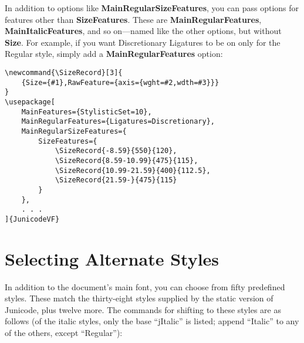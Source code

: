 \documentclass[12pt]{article}
\newcommand{\SizeRecord}[3]{{Size={#1},RawFeature={axis={wght=#2,wdth=#3}}}}
\begin{document}
\noindent In addition to options like \textbf{MainRegularSizeFeatures},
you can pass options for features other than \textbf{SizeFeatures}.
These are \textbf{MainRegularFeatures}, \textbf{MainItalicFeatures},
and so on---named like the other options, but without \textbf{Size}.
For example, if you want Discretionary Ligatures to be on only for the
Regular style, simply add a \textbf{MainRegularFeatures} option:

\footnotesize
\begin{verbatim}
\newcommand{\SizeRecord}[3]{
    {Size={#1},RawFeature={axis={wght=#2,wdth=#3}}}
}
\usepackage[
    MainFeatures={StylisticSet=10},
    MainRegularFeatures={Ligatures=Discretionary},
    MainRegularSizeFeatures={
        SizeFeatures={
            \SizeRecord{-8.59}{550}{120},
            \SizeRecord{8.59-10.99}{475}{115},
            \SizeRecord{10.99-21.59}{400}{112.5},
            \SizeRecord{21.59-}{475}{115}
        }
    },
    . . .
]{JunicodeVF}
\end{verbatim}
\normalsize

\section{Selecting Alternate Styles}

In addition to the document's main font, you can choose from fifty
predefined styles. These match the thirty-eight styles supplied by the
static version of Junicode, plus twelve more. The commands for shifting to these
styles are as follows (of the italic styles, only the base “jItalic” is listed;
append “Italic” to any of the others, except “Regular”):
\end{document}
